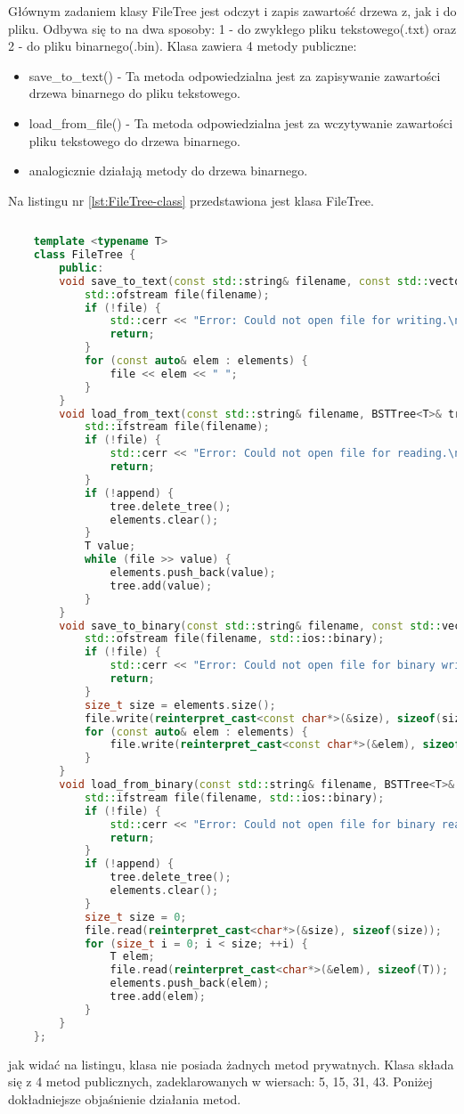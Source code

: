 Głównym zadaniem klasy FileTree jest odczyt i zapis zawartość drzewa z, jak i do pliku. Odbywa się to na dwa sposoby: 1 - do zwykłego pliku tekstowego(.txt) oraz 2 - do pliku binarnego(.bin). Klasa zawiera 4 metody publiczne:
\begin{itemize}
	\item save\_to\_text() - Ta metoda odpowiedzialna jest za zapisywanie zawartości drzewa binarnego do pliku tekstowego.
	\item load\_from\_file() - Ta metoda odpowiedzialna jest za wczytywanie zawartości pliku tekstowego do drzewa binarnego.
	\item analogicznie działają metody do drzewa binarnego.
\end{itemize}

Na listingu nr \ref{lst:FileTree-class} przedstawiona jest klasa FileTree.
\begin{lstlisting}[caption=Klasa \texttt{FileTree}, label={lst:FileTree-class}, language=C++]
	
	template <typename T>
	class FileTree {
		public:
		void save_to_text(const std::string& filename, const std::vector<T>& elements) {
			std::ofstream file(filename);
			if (!file) {
				std::cerr << "Error: Could not open file for writing.\n";
				return;
			}
			for (const auto& elem : elements) {
				file << elem << " ";
			}
		}
		void load_from_text(const std::string& filename, BSTTree<T>& tree, std::vector<T>& elements, bool append = false) {
			std::ifstream file(filename);
			if (!file) {
				std::cerr << "Error: Could not open file for reading.\n";
				return;
			}
			if (!append) {
				tree.delete_tree();
				elements.clear();
			}
			T value;
			while (file >> value) {
				elements.push_back(value);
				tree.add(value);
			}
		}
		void save_to_binary(const std::string& filename, const std::vector<T>& elements) {
			std::ofstream file(filename, std::ios::binary);
			if (!file) {
				std::cerr << "Error: Could not open file for binary writing.\n";
				return;
			}
			size_t size = elements.size();
			file.write(reinterpret_cast<const char*>(&size), sizeof(size));
			for (const auto& elem : elements) {
				file.write(reinterpret_cast<const char*>(&elem), sizeof(T));
			}
		}
		void load_from_binary(const std::string& filename, BSTTree<T>& tree, std::vector<T>& elements, bool append = false) {
			std::ifstream file(filename, std::ios::binary);
			if (!file) {
				std::cerr << "Error: Could not open file for binary reading.\n";
				return;
			}
			if (!append) {
				tree.delete_tree();
				elements.clear();
			}
			size_t size = 0;
			file.read(reinterpret_cast<char*>(&size), sizeof(size));
			for (size_t i = 0; i < size; ++i) {
				T elem;
				file.read(reinterpret_cast<char*>(&elem), sizeof(T));
				elements.push_back(elem);
				tree.add(elem);
			}
		}
	};
\end{lstlisting}
jak widać na listingu, klasa nie posiada żadnych metod prywatnych.
Klasa składa się z 4 metod publicznych, zadeklarowanych w wiersach: 5, 15, 31, 43. Poniżej dokładniejsze objaśnienie działania metod.

